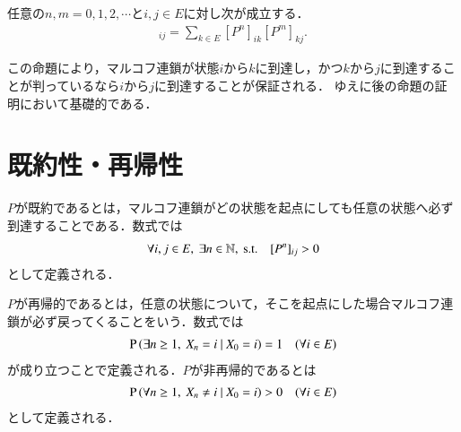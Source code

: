 	\begin{prp}
		任意の$n,m = 0,1,2,\cdots$と$i,j \in E$に対し次が成立する．
		\begin{align}
			[P^{n+m}]_{ij} = \sum_{k \in E}[P^n]_{ik}[P^m]_{kj}. 
		\end{align}
	\end{prp}
	この命題により，マルコフ連鎖が状態$i$から$k$に到達し，かつ$k$から$j$に到達することが判っているなら$i$から$j$に到達することが保証される．
	ゆえに後の命題の証明において基礎的である．

\section{既約性・再帰性}
	\begin{dfn}[既約性]
		$P$が既約であるとは，マルコフ連鎖がどの状態を起点にしても任意の状態へ必ず到達することである．数式では
		\begin{align}
			\forall i, j \in E,\ \exists n \in \mathbb{N},\ \mathrm{s.t. \quad} [P^n]_{ij} > 0
		\end{align}
		として定義される．
	\end{dfn}
	\begin{dfn}[再帰性]
		$P$が再帰的であるとは，任意の状態について，そこを起点にした場合マルコフ連鎖が必ず戻ってくることをいう．数式では
		\begin{align}
			\operatorname{P} \left( \exists n \geq 1,\ X_n = i \ \middle|\ X_0 = i \right) = 1 \quad(\forall i \in E)
		\end{align}
		が成り立つことで定義される．$P$が非再帰的であるとは
		\begin{align}
			\operatorname{P} \left( \forall n \geq 1,\ X_n \neq i \ \middle|\ X_0 = i \right) > 0 \quad(\forall i \in E)
		\end{align}
		として定義される．
	\end{dfn}
	

